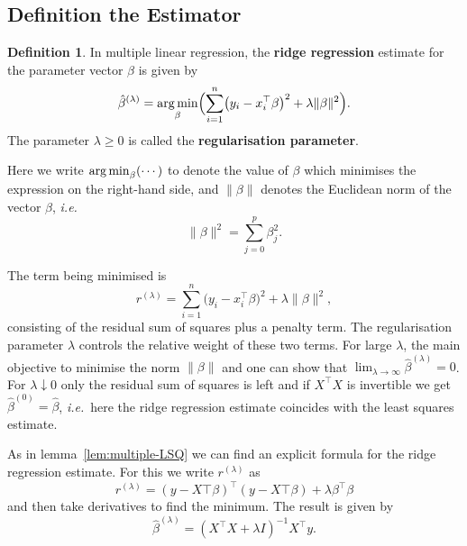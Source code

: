 \documentclass[
  a4paper,
]{article}
\theoremstyle{definition}
\newtheorem{definition}{Definition}[section]
\theoremstyle{definition}
\theoremstyle{definition}
\theoremstyle{definition}
\theoremstyle{remark}
\begin{document}
\hypertarget{definition-the-estimator}{%
\subsection{Definition the Estimator}\label{definition-the-estimator}}

\begin{definition}
In multiple linear regression, the \textbf{ridge regression} estimate for
the parameter vector \(\beta\) is given by
\begin{equation}
  \hat\beta^{(\lambda)}
  = \mathop{\mathrm{arg\,min}}\limits_\beta \Bigl(
      \sum_{i=1}^n \bigl( y_i - x_i^\top \beta \bigr)^2
      + \lambda \|\beta\|^2
    \Bigr).
\end{equation}
The parameter \(\lambda \geq 0\) is called the \textbf{regularisation parameter}.
\end{definition}

Here we write \(\mathop{\mathrm{arg\,min}}\limits\nolimits_\beta (\cdots)\) to denote the value of \(\beta\)
which minimises the expression on the right-hand side, and \(\|\beta\|\)
denotes the Euclidean norm of the vector \(\beta\), \emph{i.e.}
\begin{equation*}
  \|\beta\|^2
  = \sum_{j=0}^p \beta_j^2.
\end{equation*}

The term being minimised is
\begin{equation*}
  r^{(\lambda)}
  = \sum_{i=1}^n \bigl( y_i - x_i^\top \beta \bigr)^2
      + \lambda \|\beta\|^2,
\end{equation*}
consisting of the residual sum of squares plus a penalty term. The
regularisation parameter \(\lambda\) controls the relative weight of these two
terms. For large \(\lambda\), the main objective to minimise the norm
\(\|\beta\|\) and one can show that \(\lim_{\lambda \to\infty} \hat\beta^{(\lambda)} = 0\). For \(\lambda \downarrow 0\) only the residual sum
of squares is left and if \(X^\top X\) is invertible we get \(\hat\beta^{(0)} = \hat\beta\), \emph{i.e.}~here the ridge regression estimate coincides with the least
squares estimate.

As in lemma~\ref{lem:multiple-LSQ} we can find an explicit formula
for the ridge regression estimate. For this we write \(r^{(\lambda)}\)
as
\begin{equation*}
  r^{(\lambda)}
  = (y - X\top \beta)^\top (y - X\top \beta )
      + \lambda \beta^\top \beta
\end{equation*}
and then take derivatives to find the minimum. The result is
given by
\begin{equation}
  \hat\beta^{(\lambda)}
  = (X^\top X + \lambda I)^{-1} X^\top y.    \label{eq:1523}
\end{equation}
\end{document}
